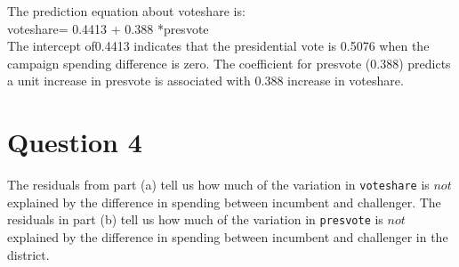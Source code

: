 \documentclass[12pt,letterpaper]{article}
\begin{document}
\begin{enumerate}
		
		\vspace{.15cm}
		 
		\vspace{.15cm}
		\noindent The prediction equation about voteshare is:\\voteshare= 0.4413 + 0.388 *presvote\\
		
		The intercept of0.4413 indicates that the presidential vote is 0.5076 when the campaign spending difference is zero. 
		The coefficient for presvote (0.388) predicts a unit increase in presvote is associated with 0.388 increase in voteshare.
	\end{enumerate}
	

\vspace{.5cm}
\section*{Question 4}
\noindent The residuals from part (a) tell us how much of the variation in \texttt{voteshare} is $not$ explained by the difference in spending between incumbent and challenger. The residuals in part (b) tell us how much of the variation in \texttt{presvote} is $not$ explained by the difference in spending between incumbent and challenger in the district.
\end{document}
